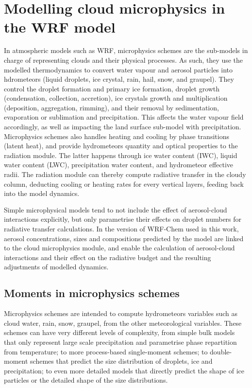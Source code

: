 \section{Modelling cloud microphysics in the WRF model} %
    In atmospheric models such as WRF, microphysics schemes are the sub-models in charge of representing clouds and their physical processes. As such, they use the modelled thermodynamics to convert water vapour and aerosol particles into hdrometeors (liquid droplets, ice crystal, rain, hail, snow, and graupel).
    They control the droplet formation and primary ice formation, droplet growth (condensation, collection, accretion), ice crystals growth and multiplication (deposition, aggregation, rimming), and their removal by sedimentation, evaporation or sublimation and precipitation. This affects the water vapour field accordingly, as well as impacting the land surface sub-model with precipitation.
    Microphysics schemes also handles heating and cooling by phase transitions (latent heat), and provide hydrometeors quantity and optical properties to the radiation module. The latter happens through ice water content (IWC), liquid water content (LWC), precipitation water content, and hydrometeor effective radii. The radiation module can thereby compute radiative transfer in the cloudy column, deducting cooling or heating rates for every vertical layers, feeding back into the model dynamics. 
    
    Simple microphysical models tend to not include the effect of aerosol-cloud interactions explicitly, but only parametrise their effects on droplet numbers for radiative transfer calculations. In the version of WRF-Chem used in this work, aerosol concentrations, sizes and compositions predicted by the model are linked to the cloud microphysics module, and enable the calculation of aerosol-cloud interactions and their effect on the radiative budget and the resulting adjustments of modelled dynamics.

    \subsection{Moments in microphysics schemes}
    \label{sec:moment_microphysics}
    Microphysics schemes are intended to compute hydrometeors variables such as cloud water, rain, snow, graupel, from the other meteorological variables.
    These schemes can have very different levels of complexity, from simple bulk models that only represent large scale precipitation and parametrise phase repartition from temperature; to more process-based single-moment schemes; to double-moment schemes that predict the size distribution of droplets, ice and precipitation; to even more detailed models that directly predict the shape of ice particles or the detailed shape of the size distributions.
    
